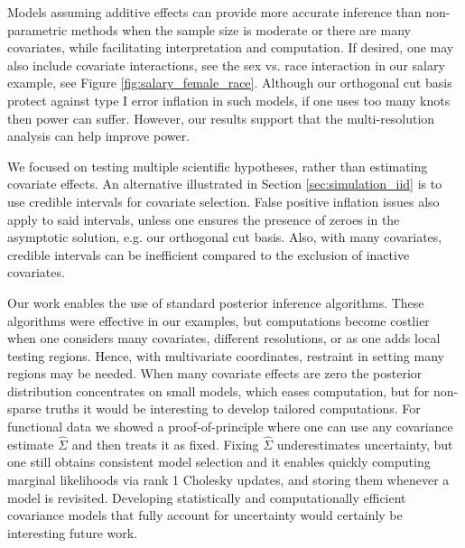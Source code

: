 Models assuming additive effects can provide more accurate inference than non-parametric methods when the sample size is moderate or there are many covariates, while facilitating interpretation and computation.  
If desired, one may also include covariate interactions, see the sex vs. race interaction in our salary example, see Figure \ref{fig:salary_female_race}.
Although our orthogonal cut basis protect against type I error inflation in such models,
if one uses too many knots then power can suffer. However, our results support that the multi-resolution analysis can help improve power.

We focused on testing multiple scientific hypotheses, rather than estimating covariate effects. An alternative illustrated in Section \ref{sec:simulation_iid} is to use credible intervals for covariate selection. 
False positive inflation issues also apply to said intervals, unless one ensures the presence of zeroes in the asymptotic solution, e.g. our orthogonal cut basis.
Also, with many covariates, credible intervals can be inefficient compared to the exclusion of inactive covariates.


Our work enables the use of standard posterior inference algorithms.
These  algorithms were effective in our examples,
but computations become costlier when one considers many covariates, different resolutions, or as one adds local testing regions.
 Hence, with multivariate coordinates, restraint in setting many regions may be needed. 
When many covariate effects are zero the posterior distribution concentrates on small models, which eases computation, but for non-sparse truths it would be interesting to develop tailored computations.
 For functional data we showed a proof-of-principle where one can use any covariance estimate $\hat{\Sigma}$ and then treats it as fixed. 
Fixing $\hat{\Sigma}$ underestimates uncertainty, but one still obtains consistent model selection and it enables
quickly computing marginal likelihoods via rank 1 Cholesky updates, and storing them whenever a model is revisited.
Developing statistically and computationally efficient covariance models that fully account for uncertainty would certainly be interesting future work. 


